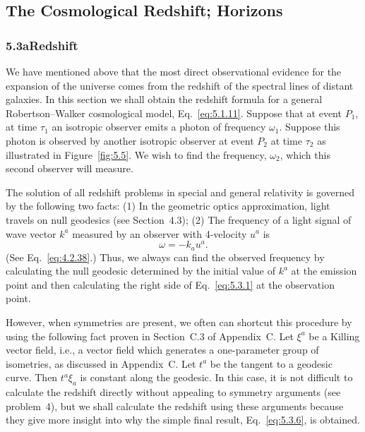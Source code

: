 
\subsection{The Cosmological Redshift; Horizons}\label{sec:5.3}



\subsubsection*{5.3a\quad Redshift}

We have mentioned above that the most direct observational evidence for the
expansion of the universe comes from the redshift of the spectral lines of distant
galaxies. In this section we shall obtain the redshift formula for a general
Robertson--Walker cosmological model, Eq.~\eqref{eq:5.1.11}. Suppose that at event
\(P_1\), at time \(\tau_1\) an isotropic observer emits a photon of frequency
\(\omega_1\). Suppose this photon is observed by another isotropic observer at event
\(P_2\) at time \(\tau_2\) as illustrated in Figure~\ref{fig:5.5}. We wish to find the
frequency, \(\omega_2\), which this second observer will measure.

The solution of all redshift problems in special and general relativity is governed by
the following two facts: (1) In the geometric optics approximation, light travels on
null geodesics (see Section~4.3); (2) The frequency of a light signal of wave vector
\(k^a\) measured by an observer with 4-velocity \(u^a\) is
\begin{equation}
  \omega=-k_a u^a.
  \tag{5.3.1}\label{eq:5.3.1}
\end{equation}
(See Eq.~\eqref{eq:4.2.38}.) Thus, we always can find the observed frequency by
calculating the null geodesic determined by the initial value of \(k^a\) at the
emission point and then calculating the right side of Eq.~\eqref{eq:5.3.1} at the
observation point.

However, when symmetries are present, we often can shortcut this procedure by using
the following fact proven in Section~C.3 of Appendix~C. Let \(\xi^a\) be a Killing
vector field, i.e., a vector field which generates a one-parameter group of isometries,
as discussed in Appendix~C. Let \(t^a\) be the tangent to a geodesic curve. Then
\(t^a\xi_a\) is constant along the geodesic. In this case, it is not difficult to
calculate the redshift directly without appealing to symmetry arguments (see
problem~4), but we shall calculate the redshift using these arguments because they
give more insight into why the simple final result, Eq.~\eqref{eq:5.3.6}, is obtained.

